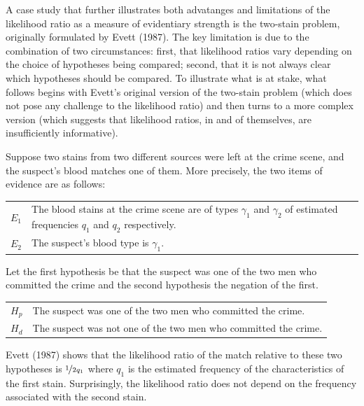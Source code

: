 \documentclass[10pt,dvipsnames,enabledeprecatedfontcommands]{scrartcl}
\begin{document}
A case study that further illustrates both advatanges and limitations of
the likelihood ratio as a measure of evidentiary strength is the
two-stain problem, originally formulated by Evett (1987). The key
limitation is due to the combination of two circumstances: first, that
likelihood ratios vary depending on the choice of hypotheses being
compared; second, that it is not always clear which hypotheses should be
compared. To illustrate what is at stake, what follows begins with
Evett's original version of the two-stain problem (which does not pose
any challenge to the likelihood ratio) and then turns to a more complex
version (which suggests that likelihood ratios, in and of themselves,
are insufficiently informative).

Suppose two stains from two different sources were left at the crime
scene, and the suspect's blood matches one of them. More precisely, the
two items of evidence are as follows: \vspace{2mm}

\begin{center}
    \begin{tabular}{lp{12cm}} 
        $E_1$ & The blood stains at the crime scene are of types $\gamma_1$ and $\gamma_2$ of estimated  frequencies $q_1$ and $q_2$ respectively.\\
        $E_2$ & The suspect's blood type is $\gamma_1$. 
    \end{tabular}
 \end{center}
\vspace{2mm}

Let the first hypothesis be that the suspect was one of the two men who
committed the crime and the second hypothesis the negation of the first.
\vspace{2mm}

\begin{center}
    \begin{tabular}{lp{12cm}} 
        $H_p$ & The suspect was one of the two men who committed the crime.\\
        $H_d$ & The suspect was not one of the two men who committed the crime.
    \end{tabular}
 \end{center}

\vspace{2mm}

Evett (1987) shows that the likelihood ratio of the match relative to
these two hypotheses is \(\nicefrac{1}{2q_1}\) where \(q_1\) is the
estimated frequency of the characteristics of the first stain.
Surprisingly, the likelihood ratio does not depend on the frequency
associated with the second stain.
\end{document}
